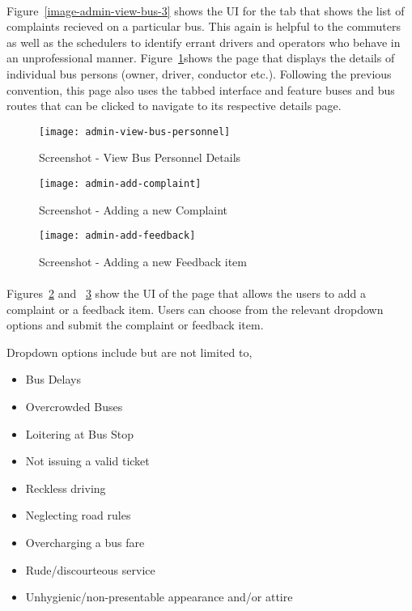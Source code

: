 \paragraph{} Figure~\ref{image-admin-view-bus-3} shows the UI for the tab that shows the list of complaints recieved on a particular bus. This again is helpful to the commuters as well as the schedulers to identify errant drivers and operators who behave in an unprofessional manner. Figure~\ref{image-admin-view-bus-personnel}shows the page that displays the details of individual bus persons (owner, driver, conductor etc.). Following the previous convention, this page also uses the tabbed interface and feature buses and bus routes that can be clicked to navigate to its respective details page.

\begin {figure} [H]
\centering
\texttt{[image: admin-view-bus-personnel]}
\caption [Screenshot - View Bus Personnel Details] {Screenshot - View Bus Personnel Details}
\label {image-admin-view-bus-personnel}
\end {figure}

\begin {figure} [H]
\centering
\texttt{[image: admin-add-complaint]}
\caption [Screenshot - Adding a new Complaint] {Screenshot - Adding a new Complaint}
\label {image-admin-add-complaint}
\end {figure}

\begin {figure} [H]
\centering
\texttt{[image: admin-add-feedback]}
\caption [Screenshot - Adding a new Feedback item] {Screenshot - Adding a new Feedback item}
\label {image-admin-add-feedback}
\end {figure}

\paragraph{} Figures~\ref{image-admin-add-complaint} and ~\ref{image-admin-add-feedback} show the UI of the page that allows the users to add a complaint or a feedback item. Users can choose from the relevant dropdown options and submit the complaint or feedback item. 

Dropdown options include but are not limited to,
\begin{itemize}
\item Bus Delays
\item Overcrowded Buses
\item Loitering at Bus Stop
\item Not issuing a valid ticket
\item Reckless driving
\item Neglecting road rules
\item Overcharging a bus fare
\item Rude/discourteous service
\item Unhygienic/non-presentable appearance and/or attire
\end{itemize}

